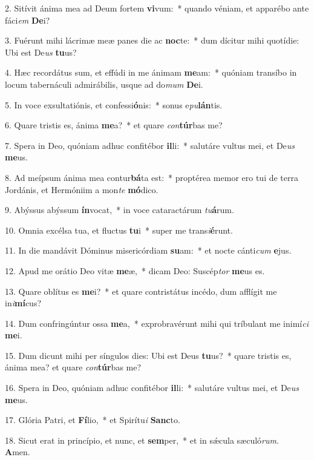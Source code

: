 2. Sitívit ánima mea ad Deum fortem \textbf{vi}vum:~*  quando véniam, et apparébo ante fáci\textit{em} \textbf{De}i?\

3. Fuérunt mihi lácrimæ meæ panes die ac \textbf{noc}te:~*  dum dícitur mihi quotídie: Ubi est De\textit{us} \textbf{tu}us?\

4. Hæc recordátus sum, et effúdi in me ánimam \textbf{me}am:~*  quóniam transíbo in locum tabernáculi admirábilis, usque ad do\textit{mum} \textbf{De}i.\

5. In voce exsultatiónis, et confessi\textbf{ó}nis:~*  sonus e\textit{pu}\textbf{lán}tis.\

6. Quare tristis es, ánima \textbf{me}a?~*  et quare \textit{con}\textbf{túr}bas me?\

7. Spera in Deo, quóniam adhuc confitébor \textbf{il}li:~*  salutáre vultus mei, et De\textit{us} \textbf{me}us.\

8. Ad meípsum ánima mea contur\textbf{bá}ta est:~*  proptérea memor ero tui de terra Jordánis, et Hermóniim a mon\textit{te} \textbf{mó}dico.\

9. Abýssus abýssum \textbf{ín}vocat,~*  in voce cataractárum \textit{tu}\textbf{á}rum.\

10. Omnia excélsa tua, et fluctus \textbf{tu}i~*  super me trans\textit{i}\textbf{é}runt.\

11. In die mandávit Dóminus misericórdiam \textbf{su}am:~*  et nocte cánti\textit{cum} \textbf{e}jus.\

12. Apud me orátio Deo vitæ \textbf{me}æ,~*  dicam Deo: Suscép\textit{tor} \textbf{me}us es.\

13. Quare oblítus es \textbf{me}i?~*  et quare contristátus incédo, dum afflígit me in\textit{i}\textbf{mí}cus?\

14. Dum confringúntur ossa \textbf{me}a,~*  exprobravérunt mihi qui tríbulant me inimí\textit{ci} \textbf{me}i.\

15. Dum dicunt mihi per síngulos dies: Ubi est Deus \textbf{tu}us?~*  quare tristis es, ánima mea? et quare \textit{con}\textbf{túr}bas me?\

16. Spera in Deo, quóniam adhuc confitébor \textbf{il}li:~*  salutáre vultus mei, et De\textit{us} \textbf{me}us.\

17. Glória Patri, et \textbf{Fí}lio,~*  et Spirítu\textit{i} \textbf{Sanc}to.\

18. Sicut erat in princípio, et nunc, et \textbf{sem}per,~*  et in sǽcula sæculó\textit{rum}. \textbf{A}men.\


